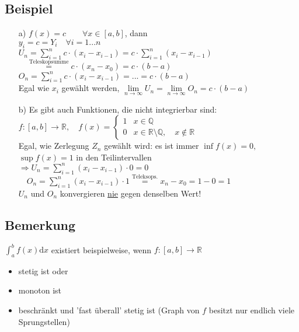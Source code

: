 \documentclass[12pt, titlepage]{article}
\newcommand{\R}{\mathds{R}}
\newcommand{\infn}{n\rightarrow\infty}
\renewcommand{\>}{\rightarrow}
\renewcommand{\*}{\cdot}
\begin{document}
	\subsection{Beispiel}
	\begin{itemize}
		\item[a)] $f(x)=c\qquad\forall x \in[a,b]$, dann\\
		$y_i=c=Y_i\quad\forall i=1...n$\\
		$U_n=\sum_{i=1}^{n}c\*(x_i-x_{i-1})=c\*\sum_{i=1}^{n}(x_i-x_{i-1})$\\
		$\quad\overset{\textrm{Teleskopsumme}}{=}c\*(x_n-x_0)=c\*(b-a)$\\
		$O_n=\sum_{i=1}^{n}c\*(x_i-x_{i-1})=...=c\*(b-a)$\\
		Egal wie $x_i$ gewählt werden, $\lim\limits_{\infn}U_n=\lim\limits_{\infn}O_n=c\*(b-a)$
		\item[b)] Es gibt auch Funktionen, die nicht integrierbar sind:\\
		$f\colon[a,b]\>\R,\quad f(x)=\begin{cases}1&x\in\mathds{Q}\\
		0&x\in\R\setminus\mathds{Q},\quad x\notin\R
		\end{cases}$\\
		Egal, wie Zerlegung $Z_n$ gewählt wird: es ist immer $\inf f(x)=0,$\\
		$ \sup f(x)=1$ in den Teilintervallen\\
		$\Rightarrow U_n=\sum_{i=1}^{n}(x_i-x_{i-1})\*0=0$\\
		$\quad O_n=\sum_{i=1}^{n}(x_i-x_{i-1})\*1\overset{\textrm{Teleksops.}}{=}x_n-x_0=1-0=1$\\
		$U_n$ und $O_n$ konvergieren \underline{nie} gegen denselben Wert!		
	\end{itemize}
	\subsection{Bemerkung}
	$\int_{a}^{b}f(x)\textrm{d}x$ existiert beispielweise, wenn $f\colon[a,b]\>\R$
	\begin{itemize}
		\item stetig ist oder
		\item monoton ist
		\item beschränkt und 'fast überall' stetig ist (Graph von $f$ besitzt nur endlich viele Sprungstellen)
	\end{itemize}
\end{document}
